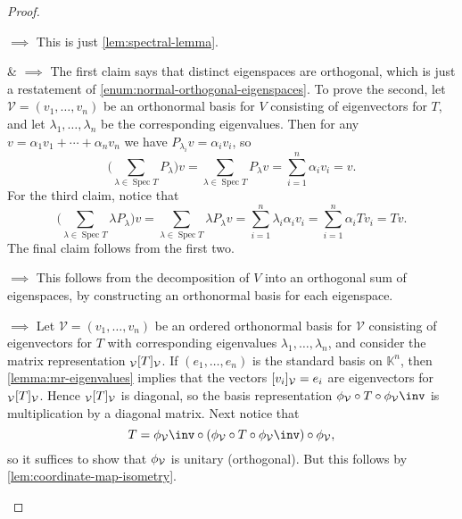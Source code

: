 \documentclass[article, a4paper, 11pt, oneside]{memoir}
\numberwithin{equation}{chapter}
\newcommand{\calV}{\mathcal{V}}
\DeclareMathOperator{\spec}{Spec}
\begin{document}
\begin{proof}
\begin{proofsec}
    \item[\subcref{enum:spectral-selfadjoint-normal} $\implies$ \subcref{enum:spectral-orthogonally-diagonalisable}]
    This is just \cref{lem:spectral-lemma}.

    \item[\subcref{enum:spectral-selfadjoint-normal} \& \subcref{enum:spectral-orthogonally-diagonalisable} $\implies$ \subcref{enum:spectral-operator-decomposition}]
    The first claim says that distinct eigenspaces are orthogonal, which is just a restatement of \cref{enum:normal-orthogonal-eigenspaces}. To prove the second, let $\calV = (v_1, \ldots, v_n)$ be an orthonormal basis for $V$ consisting of eigenvectors for $T$, and let $\lambda_1, \ldots, \lambda_n$ be the corresponding eigenvalues. Then for any $v = \alpha_1 v_1 + \cdots + \alpha_n v_n$ we have $P_{\lambda_i} v = \alpha_i v_i$, so
    \begin{equation*}
        \biggl( \sum_{\lambda \in \spec T} P_\lambda \biggr) v
            = \sum_{\lambda \in \spec T} P_\lambda v
            = \sum_{i=1}^n \alpha_i v_i
            = v.
    \end{equation*}
    For the third claim, notice that
    \begin{equation*}
        \biggl( \sum_{\lambda \in \spec T} \lambda P_\lambda \biggr) v
            = \sum_{\lambda \in \spec T} \lambda P_\lambda v
            = \sum_{i=1}^n \lambda_i \alpha_i v_i
            = \sum_{i=1}^n \alpha_i Tv_i
            = Tv.
    \end{equation*}
    The final claim follows from the first two.

    \item[\subcref{enum:spectral-operator-decomposition} $\implies$ \subcref{enum:spectral-orthogonally-diagonalisable}]
    This follows from the decomposition of $V$ into an orthogonal sum of eigenspaces, by constructing an orthonormal basis for each eigenspace.

    \item[\subcref{enum:spectral-orthogonally-diagonalisable} $\implies$ \subcref{enum:spectral-multiplication-operator}]
    Let $\calV = (v_1, \ldots, v_n)$ be an ordered orthonormal basis for $\calV$ consisting of eigenvectors for $T$ with corresponding eigenvalues $\lambda_1, \ldots, \lambda_n$, and consider the matrix representation $\mr{\calV}{T}{\calV}$. If $(e_1, \ldots, e_n)$ is the standard basis on $\mathbb{K}^n$, then \cref{lemma:mr-eigenvalues} implies that the vectors $\coordvec{v_i}{\calV} = e_i$ are eigenvectors for $\mr{\calV}{T}{\calV}$. Hence $\mr{\calV}{T}{\calV}$ is diagonal, so the basis representation $\coordmap{\calV} \circ T \circ \coordmap{\calV}\inv$ is multiplication by a diagonal matrix. Next notice that
    \begin{equation*}
        T
            = \coordmap{\calV}\inv \circ (\coordmap{\calV} \circ T \circ \coordmap{\calV}\inv) \circ \coordmap{\calV},
    \end{equation*}
    so it suffices to show that $\coordmap{\calV}$ is unitary (orthogonal). But this follows by \cref{lem:coordinate-map-isometry}.


\end{proofsec}
\end{proof}
\end{document}
